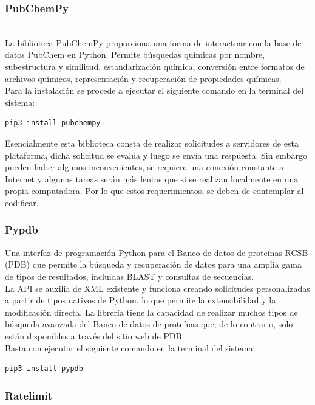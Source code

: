{{\subsubsection{PubChemPy}\\

\noindent La biblioteca PubChemPy proporciona una forma de interactuar con la base de datos PubChem en Python. Permite búsquedas químicas por nombre, subestructura y similitud, estandarización química, conversión entre formatos de archivos químicos, representación y recuperación de propiedades químicas.\\
 
\noindent Para la instalación se procede a ejecutar el siguiente comando en la terminal del sistema:
\begin{lstlisting}
pip3 install pubchempy
\end{lstlisting}
\noindent Esencialmente esta biblioteca consta de realizar solicitudes a servidores de esta plataforma, dicha solicitud se evalúa y luego se envía una respuesta. Sin embargo pueden haber algunos inconvenientes, se requiere una conexión constante a Internet y algunas tareas serán más lentas que si se realizan localmente en una propia computadora. Por lo que estos requerimientos, se deben de contemplar al codificar.

\subsubsection{Pypdb}

\noindent Una interfaz de programación Python para el Banco de datos de proteínas RCSB (PDB) que permite la búsqueda y recuperación de datos para una amplia gama de tipos de resultados, incluidas BLAST y consultas de secuencias.\\

\noindent La API se auxilia de XML existente y funciona creando solicitudes personalizadas a partir de tipos nativos de Python, lo que permite la extensibilidad y la modificación directa. La librería tiene la capacidad de realizar muchos tipos de búsqueda avanzada del Banco de datos de proteínas que, de lo contrario, solo están disponibles a través del sitio web de PDB.\\

Basta con ejecutar el siguiente comando en la terminal del sistema:
\begin{lstlisting}
pip3 install pypdb
\end{lstlisting}

\subsubsection{Ratelimit}

}}
